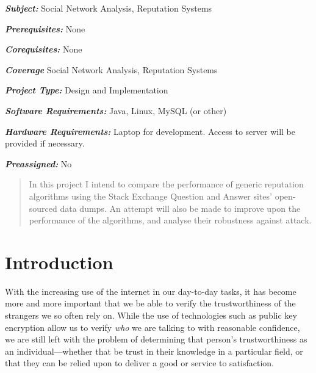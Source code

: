 \documentclass[]{final_report}
\begin{document}
\maketitle
\tableofcontents{}\newpage

\begin{specification}

\textbf{\textsl{Subject:}} Social Network Analysis, Reputation Systems

\textbf{\textsl{Prerequisites:}} None

\textbf{\textsl{Corequisites:}} None

\textbf{\textsl{Coverage}} Social Network Analysis, Reputation Systems

\textbf{\textsl{Project Type:}} Design and Implementation

\textbf{\textsl{Software Requirements:}} Java, Linux, MySQL (or other)

\textbf{\textsl{Hardware Requirements:}} Laptop for development. Access to server will be provided if necessary.

\textbf{\textsl{Preassigned:}} No

\end{specification}



\begin{abstract}

In this project I intend to compare the performance of generic reputation algorithms using the Stack Exchange Question and Answer sites' open-sourced data dumps. An attempt will also be made to improve upon the performance of the algorithms, and analyse their robustness against attack.

\end{abstract}
\newpage


\chapter{Introduction}

With the increasing use of the internet in our day-to-day tasks, it has become more and more important that we be able to verify the trustworthiness of the strangers we so often rely on. While the use of technologies such as public key encryption allow us to verify \textsl{who} we are talking to with reasonable confidence, we are still left with the problem of determining that person's trustworthiness as an individual---whether that be trust in their knowledge in a particular field, or that they can be relied upon to deliver a good or service to satisfaction.
\end{document}
